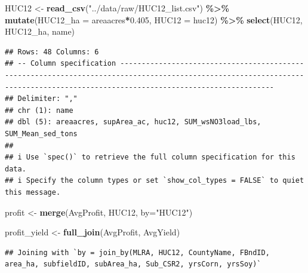\documentclass[
]{article}
\newenvironment{Shaded}{\begin{snugshade}}{\end{snugshade}}
\newcommand{\AttributeTok}[1]{\textcolor[rgb]{0.13,0.29,0.53}{#1}}
\newcommand{\FloatTok}[1]{\textcolor[rgb]{0.00,0.00,0.81}{#1}}
\newcommand{\FunctionTok}[1]{\textcolor[rgb]{0.13,0.29,0.53}{\textbf{#1}}}
\newcommand{\NormalTok}[1]{#1}
\newcommand{\OtherTok}[1]{\textcolor[rgb]{0.56,0.35,0.01}{#1}}
\newcommand{\SpecialCharTok}[1]{\textcolor[rgb]{0.81,0.36,0.00}{\textbf{#1}}}
\newcommand{\StringTok}[1]{\textcolor[rgb]{0.31,0.60,0.02}{#1}}
\begin{document}
\begin{Shaded}
\begin{Highlighting}[]
\NormalTok{HUC12 }\OtherTok{\textless{}{-}} \FunctionTok{read\_csv}\NormalTok{(}\StringTok{"../data/raw/HUC12\_list.csv"}\NormalTok{) }\SpecialCharTok{\%\textgreater{}\%}
  \FunctionTok{mutate}\NormalTok{(}\AttributeTok{HUC12\_ha =}\NormalTok{ areaacres}\SpecialCharTok{*}\FloatTok{0.405}\NormalTok{,}
         \AttributeTok{HUC12 =}\NormalTok{ huc12) }\SpecialCharTok{\%\textgreater{}\%}
  \FunctionTok{select}\NormalTok{(HUC12, HUC12\_ha, name)}
\end{Highlighting}
\end{Shaded}

\begin{verbatim}
## Rows: 48 Columns: 6
## -- Column specification --------------------------------------------------------------------------------------------------------------------------------------------------------------------------------
## Delimiter: ","
## chr (1): name
## dbl (5): areaacres, supArea_ac, huc12, SUM_wsNO3load_lbs, SUM_Mean_sed_tons
## 
## i Use `spec()` to retrieve the full column specification for this data.
## i Specify the column types or set `show_col_types = FALSE` to quiet this message.
\end{verbatim}

\begin{Shaded}
\begin{Highlighting}[]
\NormalTok{profit }\OtherTok{\textless{}{-}} \FunctionTok{merge}\NormalTok{(AvgProfit, HUC12, }\AttributeTok{by=}\StringTok{"HUC12"}\NormalTok{)}

\NormalTok{profit\_yield }\OtherTok{\textless{}{-}} \FunctionTok{full\_join}\NormalTok{(AvgProfit, AvgYield)}
\end{Highlighting}
\end{Shaded}

\begin{verbatim}
## Joining with `by = join_by(MLRA, HUC12, CountyName, FBndID, area_ha, subfieldID, subArea_ha, Sub_CSR2, yrsCorn, yrsSoy)`
\end{verbatim}
\end{document}
